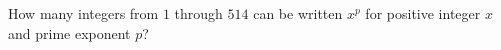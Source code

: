 How many integers from $1$ through $514$ can be written $x^p$ for positive integer $x$ and prime exponent $p$?
